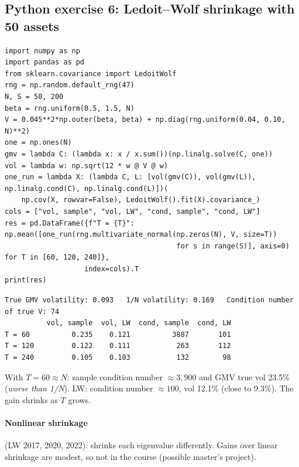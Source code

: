 \documentclass[11pt,a4paper]{report}
\begin{document}
\subsection*{Python exercise 6: Ledoit--Wolf shrinkage with 50 assets}
\begin{lstlisting}
import numpy as np
import pandas as pd
from sklearn.covariance import LedoitWolf
rng = np.random.default_rng(47)
N, S = 50, 200
beta = rng.uniform(0.5, 1.5, N)
V = 0.045**2*np.outer(beta, beta) + np.diag(rng.uniform(0.04, 0.10, N)**2)
one = np.ones(N)
gmv = lambda C: (lambda x: x / x.sum())(np.linalg.solve(C, one))
vol = lambda w: np.sqrt(12 * w @ V @ w)
one_run = lambda X: (lambda C, L: [vol(gmv(C)), vol(gmv(L)), np.linalg.cond(C), np.linalg.cond(L)])(
    np.cov(X, rowvar=False), LedoitWolf().fit(X).covariance_)
cols = ["vol, sample", "vol, LW", "cond, sample", "cond, LW"]
res = pd.DataFrame({f"T = {T}": np.mean([one_run(rng.multivariate_normal(np.zeros(N), V, size=T))
                                         for s in range(S)], axis=0) for T in [60, 120, 240]},
                   index=cols).T
print(res)
\end{lstlisting}
\begin{lstlisting}[style=out]
True GMV volatility: 0.093   1/N volatility: 0.169   Condition number of true V: 74
          vol, sample  vol, LW  cond, sample  cond, LW
T = 60          0.235    0.121          3887       101
T = 120         0.122    0.111           263       112
T = 240         0.105    0.103           132        98
\end{lstlisting}
With $T=60\approx N$: sample condition number $\approx3{,}900$ and GMV true vol 23.5\%
(\emph{worse than 1/N}). LW: condition number $\approx100$, vol 12.1\% (close to 9.3\%).
The gain shrinks as $T$ grows.

\paragraph{Nonlinear shrinkage} (LW 2017, 2020, 2022): shrinks each eigenvalue
differently. Gains over linear shrinkage are modest, so not in the course
(possible master's project).
\end{document}
